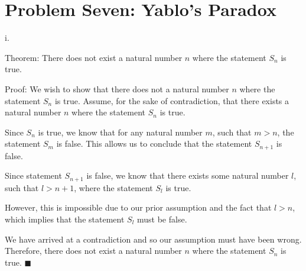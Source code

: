 \documentclass{article}
\renewcommand{\(}{\left(}
\renewcommand{\)}{\right)}
\theoremstyle{plain}
\theoremstyle{plain}
\theoremstyle{definition}
\begin{document}
\newpage

\section*{Problem Seven: Yablo's Paradox}
    i.
    \begin{shaded}
                Theorem: There does not exist a natural number $n$ where the statement $S_{n}$ is true.

                \vspace{4mm}                

                Proof: We wish to show that there does not a natural number $n$ where the statement $S_{n}$ is true. Assume, for the sake of contradiction, that there exists a natural number $n$ where the statement $S_{n}$ is true.

                \vspace{4mm}

                Since $S_{n}$ is true, we know that for any natural number $m$, such that $m>n$, the statement $S_{m}$ is false. This allows us to conclude that the statement $S_{n+1}$ is false. 

                \vspace{4mm}
                
                Since statement $S_{n+1}$ is false, we know that there exists some natural number $l$, such that $l>n+1$, where the statement $S_{l}$ is true.

                \vspace{4mm}

                However, this is impossible due to our prior assumption and the fact that $l>n$, which implies that the statement $S_{l}$ must be false.
                
                \vspace{4mm} 
                
                We have arrived at a contradiction and so our assumption must have been wrong. Therefore, there does not exist a natural number $n$ where the statement $S_{n}$ is true. $\blacksquare$
    \end{shaded}
    
\end{document}
